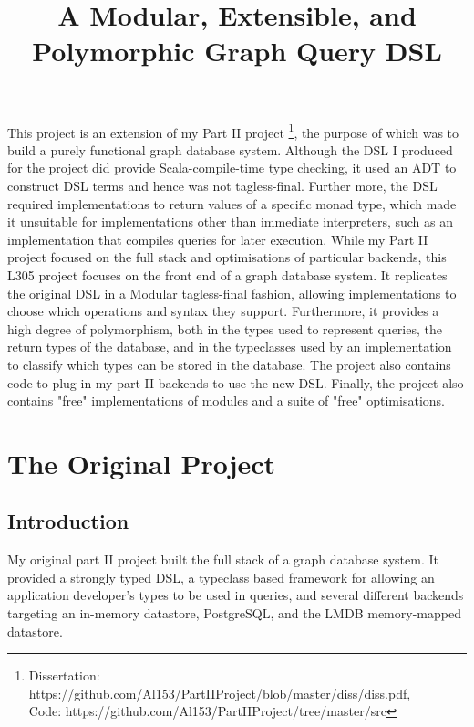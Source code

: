 \documentclass{report}
\newcommand \2[0]{\textbf{2}}
\newcommand \3[0]{\textbf{3}}
\begin{document}
\title{A Modular, Extensible, and Polymorphic Graph Query DSL}

\abstract
This project is an extension of my Part II project \footnote{Dissertation: https://github.com/Al153/PartIIProject/blob/master/diss/diss.pdf,\\ Code: https://github.com/Al153/PartIIProject/tree/master/src}, the purpose of which was to build a purely functional graph database system. Although the DSL I produced for the project did provide Scala-compile-time type checking, it used an ADT to construct DSL terms and hence was not tagless-final. Further more, the DSL required implementations to return values of a specific monad type, which made it unsuitable for implementations other than immediate interpreters, such as an implementation that compiles queries for later execution. While my Part II project focused on the full stack and optimisations of particular backends, this L305 project focuses on the front end of a graph database system. It replicates the original DSL in a Modular tagless-final fashion, allowing implementations to choose which operations and syntax they support. Furthermore, it provides a high degree of polymorphism, both in the types used to represent queries, the return types of the database, and in the typeclasses used by an implementation to classify which types can be stored in the database. The project also contains code to plug in my part II backends to use the new DSL. Finally, the project also contains "free" implementations of modules and a suite of "free" optimisations.

\chapter{The Original Project}
\section{Introduction}
My original part II project built the full stack of a graph database system. It provided a strongly typed DSL, a typeclass based framework for allowing an application developer's types to be used in queries, and several different backends targeting an in-memory datastore, PostgreSQL, and the LMDB memory-mapped datastore.
\end{document}
